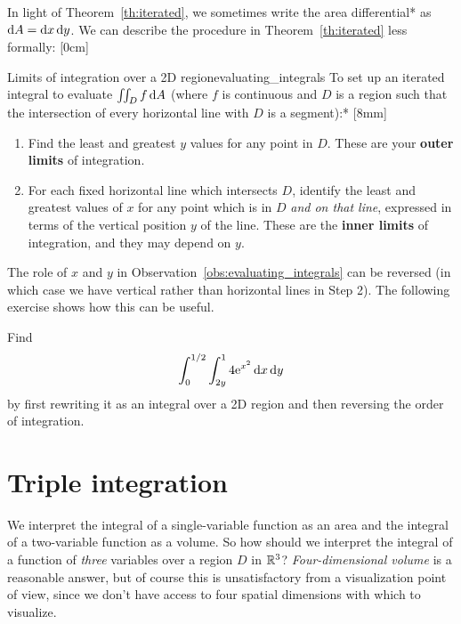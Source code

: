 \documentclass[prettycode,shellescape]{watsonbook}
\begin{document}
In light of Theorem~\ref{th:iterated}, we sometimes write the area
differential* as $\mathrm{d} A = \mathrm{d} x \, \mathrm{d} y$. We can describe the procedure
in Theorem~\ref{th:iterated} less formally: [0cm]
\begin{obs}{Limits of integration over a 2D
    region}{evaluating_integrals}
  To set up an iterated integral to evaluate $\iint_D f \, {\mathrm{d}}A$
  (where $f$ is continuous and $D$ is a region such that the
  intersection of every horizontal line with $D$ is a segment):*
  [8mm] 
  \begin{enumerate}[leftmargin=12pt, itemsep = 6pt, topsep = 5pt]
  \item Find the least and greatest $y$ values for any point in
    $D$. These are your \textbf{outer limits} of integration. 
  \item For each fixed horizontal line which intersects $D$, identify
    the least and greatest values of $x$ for any point which is in $D$
    \textit{and on that line}, expressed in terms of the vertical
    position $y$ of the line. These are the \textbf{inner limits} of
    integration, and they may depend on $y$.
  \end{enumerate}
\end{obs}

The role of $x$ and $y$ in Observation~\ref{obs:evaluating_integrals}
can be reversed (in which case we have vertical rather than horizontal
lines in Step 2). The following exercise shows how this can be useful.

\begin{exercise}{}{}
  Find
  \[
    \int_0^{1/2} \int_{2y}^1 4 \mathrm{e}^{x^2}\, \mathrm{d} x\, \mathrm{d} y
  \]
  by first rewriting it as an integral over a 2D region and then
  reversing the order of integration.
\end{exercise}


\section{Triple integration} \label{sec:triple} 


We interpret the integral of a single-variable function as an area and
the integral of a two-variable function as a volume. So how should we
interpret the integral of a function of \textit{three} variables over
a region $D$ in $\mathbb{R}^3$?  \textit{Four-dimensional volume} is a
reasonable answer, but of course this is unsatisfactory from a
visualization point of view, since we don't have access to four
spatial dimensions with which to visualize.
\end{document}
